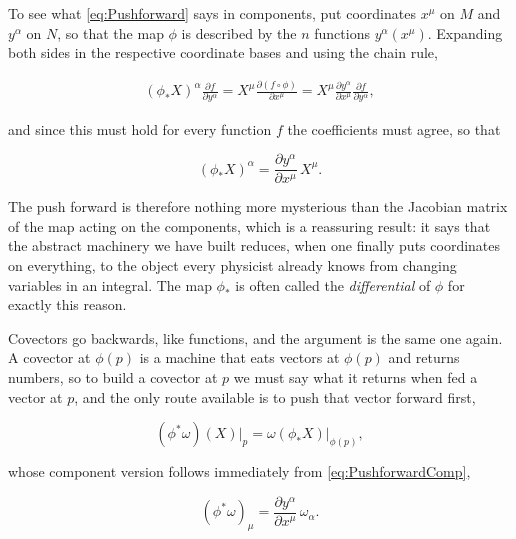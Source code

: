         To see what \ref{eq:Pushforward} says in components, put coordinates $x^{\mu}$ on $M$ and $y^{\alpha}$ on $N$, so that the map $\phi$ is described by the $n$ functions $y^{\alpha}(x^{\mu})$. Expanding both sides in the respective coordinate bases and using the chain rule,

        \begin{align*}
            \left(\phi_{*}X\right)^{\alpha}\frac{\partial f}{\partial y^{\alpha}} = X^{\mu}\frac{\partial\left(f\circ\phi\right)}{\partial x^{\mu}} = X^{\mu}\frac{\partial y^{\alpha}}{\partial x^{\mu}}\frac{\partial f}{\partial y^{\alpha}},
        \end{align*}

        and since this must hold for every function $f$ the coefficients must agree, so that

        \begin{equation}\label{eq:PushforwardComp}
            \left(\phi_{*}X\right)^{\alpha} = \frac{\partial y^{\alpha}}{\partial x^{\mu}}\,X^{\mu}.
        \end{equation}

        The push forward is therefore nothing more mysterious than the Jacobian matrix of the map acting on the components, which is a reassuring result: it says that the abstract machinery we have built reduces, when one finally puts coordinates on everything, to the object every physicist already knows from changing variables in an integral. The map $\phi_{*}$ is often called the \textit{differential} of $\phi$ for exactly this reason.

        Covectors go backwards, like functions, and the argument is the same one again. A covector at $\phi(p)$ is a machine that eats vectors at $\phi(p)$ and returns numbers, so to build a covector at $p$ we must say what it returns when fed a vector at $p$, and the only route available is to push that vector forward first,

        \begin{equation}\label{eq:PullbackForm}
            \left(\phi^{*}\omega\right)(X)\Big|_{p} = \omega\left(\phi_{*}X\right)\Big|_{\phi(p)},
        \end{equation}

        whose component version follows immediately from \ref{eq:PushforwardComp},

        \begin{equation}\label{eq:PullbackFormComp}
            \left(\phi^{*}\omega\right)_{\mu} = \frac{\partial y^{\alpha}}{\partial x^{\mu}}\,\omega_{\alpha}.
        \end{equation}

